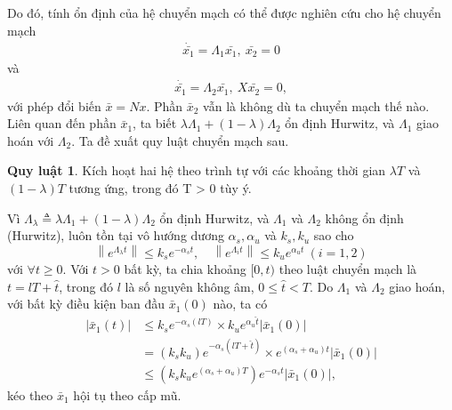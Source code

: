 \documentclass[12pt,a4paper]{report}
\theoremstyle{definition}
\newtheorem{ql}{Quy luật}
\theoremstyle{definition}
\numberwithin{dl}{chapter}
\numberwithin{vd}{chapter}
\numberwithin{corollary}{chapter}
\numberwithin{lemma}{chapter}
\numberwithin{md}{chapter}
\numberwithin{dn}{chapter}
\numberwithin{cy}{chapter}
\numberwithin{nx}{chapter}
\begin{document}
Do đó, tính ổn định của hệ chuyển mạch có thể được nghiên cứu cho hệ chuyển mạch 
$$
  \begin{aligned}
  \dot{\bar{x_1}}= \Lambda_{1} \bar{x_1}, \ \bar{x_2}=0
   \end{aligned}
$$
và
$$
\begin{aligned}
  \dot{\bar{x_1}}= \Lambda_{2} \bar{x_1}, \ X\bar{x_2}=0,
   \end{aligned}
$$
với phép đổi biến $\bar{x}=N x$. Phần $\bar{x}_{2}$ vẫn là không dù ta chuyển mạch thế nào. Liên quan đến phần $\bar{x}_{1}$, ta biết $\lambda \Lambda_{1}+(1-\lambda) \Lambda_{2}$ ổn định Hurwitz, và $\Lambda_{1}$ giao hoán với $\Lambda_{2}$. Ta đề xuất quy luật chuyển mạch sau.

\begin{ql} \label{ql1}
Kích hoạt hai hệ theo trình tự với các khoảng thời gian $\lambda T$ và $(1-\lambda) T$ tương ứng, trong đó T > 0 tùy ý.
\end{ql}

Vì $\Lambda_{\lambda} \triangleq \lambda \Lambda_{1}+(1-\lambda) \Lambda_{2}$ ổn định Hurwitz, và $\Lambda_{1}$ và $\Lambda_{2}$ không ổn định (Hurwitz), luôn tồn tại vô hướng dương $\alpha_{s}, \alpha_{u}$ và $k_{s}, k_{u}$ sao cho 
\begin{equation}\label{2.69}
\left\|e^{\Lambda_{\lambda} t}\right\| \leq k_{s} e^{-\alpha_{s} t}, \quad\left\|e^{\Lambda_{i} t}\right\| \leq k_{u} e^{\alpha_{u} t} \ (i=1,2) 
\end{equation}
với $\forall t \geq 0$. Với $t>0$ bất kỳ, ta chia khoảng $[0, t)$ theo luật chuyển mạch là $t=l T+\hat{t}$, trong đó $l$ là số nguyên không âm, $0 \leq \hat{t}<T$. Do $\Lambda_{1}$ và $\Lambda_{2}$ giao hoán, với bất kỳ điều kiện ban đầu $\bar{x}_{1}(0)$ nào, ta có
\begin{equation}\label{2.70}
\begin{aligned}
\left|\bar{x}_{1}(t)\right| & \leq k_{s} e^{-\alpha_{s}(l T)} \times k_{u} e^{\alpha_{u} \hat{t}}\left|\bar{x}_{1}(0)\right| \\
&=\left(k_{s} k_{u}\right) e^{-\alpha_{s}(l T+\hat{t})} \times e^{\left(\alpha_{s}+\alpha_{u}\right) t}\left|\bar{x}_{1}(0)\right| \\
& \leq\left(k_{s} k_{u} e^{\left(\alpha_{s}+\alpha_{u}\right) T}\right) e^{-\alpha_{s} t}\left|\bar{x}_{1}(0)\right|, 
\end{aligned} 
\end{equation}
kéo theo $\bar{x}_{1}$ hội tụ theo cấp mũ.
\end{document}
